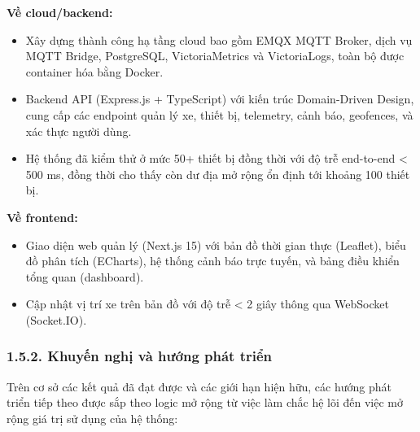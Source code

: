 \documentclass[a4paper]{extarticle}
\providecommand{\tightlist}{%
  \setlength{\itemsep}{0pt}\setlength{\parskip}{0pt}}
\begin{document}
\textbf{Về cloud/backend:}

\begin{itemize}
\tightlist
\item
  Xây dựng thành công hạ tầng cloud bao gồm EMQX MQTT Broker, dịch vụ
  MQTT Bridge, PostgreSQL, VictoriaMetrics và VictoriaLogs, toàn bộ được
  container hóa bằng Docker.
\item
  Backend API (Express.js + TypeScript) với kiến trúc Domain-Driven
  Design, cung cấp các endpoint quản lý xe, thiết bị, telemetry, cảnh
  báo, geofences, và xác thực người dùng.
\item
  Hệ thống đã kiểm thử ở mức 50+ thiết bị đồng thời với độ trễ
  end-to-end \textless{} 500 ms, đồng thời cho thấy còn dư địa mở rộng
  ổn định tới khoảng 100 thiết bị.
\end{itemize}

\textbf{Về frontend:}

\begin{itemize}
\tightlist
\item
  Giao diện web quản lý (Next.js 15) với bản đồ thời gian thực
  (Leaflet), biểu đồ phân tích (ECharts), hệ thống cảnh báo trực tuyến,
  và bảng điều khiển tổng quan (dashboard).
\item
  Cập nhật vị trí xe trên bản đồ với độ trễ \textless{} 2 giây thông qua
  WebSocket (Socket.IO).
\end{itemize}

\subsubsection{1.5.2. Khuyến nghị và hướng phát
triển}\label{152-khuyux1ebfn-nghux1ecb-vuxe0-hux1b0ux1edbng-phuxe1t-triux1ec3n}

Trên cơ sở các kết quả đã đạt được và các giới hạn hiện hữu, các hướng phát
triển tiếp theo được sắp theo logic mở rộng từ việc làm chắc hệ lõi đến
việc mở rộng giá trị sử dụng của hệ thống:
\end{document}
